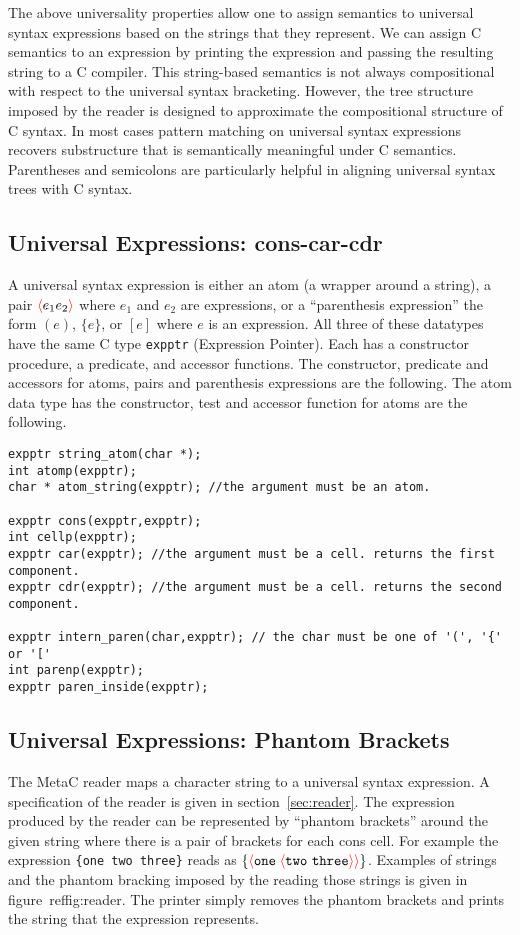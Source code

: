\documentclass{article}
\newcommand{\mtt}[1]{\mbox{\tt #1}}
\newcommand{\fopen}{{\color{red} \langle}}
\newcommand{\fclose}{{\color{red} \rangle}}
\begin{document}
The above universality properties allow one to assign semantics to universal syntax expressions based on the strings that they represent.  We can assign C
semantics to an expression by printing the expression and passing the resulting string to a C compiler.  This string-based semantics is not always
compositional with respect to the universal syntax bracketing.  However, the tree structure imposed by the reader is designed to approximate the
compositional structure of C syntax.  In most cases pattern matching on universal syntax expressions recovers substructure that is semantically meaningful under C
semantics. Parentheses and semicolons are particularly helpful in aligning universal syntax trees with C syntax.

\subsection{Universal Expressions: cons-car-cdr}

A universal syntax expression is either an atom (a wrapper around a string),
a pair $\fopen e_1 e_2 \fclose$ where $e_1$ and $e_2$ are expressions, or a ``parenthesis expression'' the form $(e)$,
$\{ e\}$, or $[e]$ where $e$ is an expression.   All three of these datatypes have the same C type {\tt expptr} (Expression Pointer).
Each has a constructor procedure, a predicate, and accessor functions.  The constructor, predicate and accessors for atoms, pairs and parenthesis expressions
are the following.
The atom data type has the constructor, test and accessor function for atoms are the following.

\begin{verbatim}
expptr string_atom(char *);
int atomp(expptr);
char * atom_string(expptr); //the argument must be an atom.

expptr cons(expptr,expptr);
int cellp(expptr);
expptr car(expptr); //the argument must be a cell. returns the first component.
expptr cdr(expptr); //the argument must be a cell. returns the second component.

expptr intern_paren(char,expptr); // the char must be one of '(', '{' or '['
int parenp(expptr);
expptr paren_inside(expptr);
\end{verbatim}

\subsection{Universal Expressions: Phantom Brackets}

The MetaC reader maps a character string to a universal syntax expression.  A specification of the reader is given in section~\ref{sec:reader}.
The expression produced by the reader
can be represented by ``phantom brackets'' around the given string
where there is a pair of brackets for each cons cell.
For example the expression \mtt{\{one two three\}} reads as $\{\fopen \mathtt{one}\;\fopen \mathtt{two~three}\fclose \fclose\}$.
Examples of strings and the phantom bracking imposed by the reading those strings is given in figure~{ref{fig:reader}}.
The printer simply removes the phantom brackets and prints the string that the expression represents.
\end{document}

